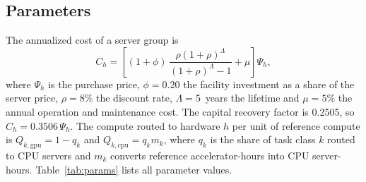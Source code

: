 \documentclass[11pt]{article}
\begin{document}
\subsection*{Parameters}
The annualized cost of a server group is
\begin{equation}
C_h=\left[(1+\phi)\,\frac{\rho(1+\rho)^{\Lambda}}{(1+\rho)^{\Lambda}-1}+\mu\right]\Psi_h,\label{eq:annual}
\end{equation}
where $\Psi_h$ is the purchase price, $\phi=0.20$ the facility investment as a share of the server price, $\rho=8\%$ the discount rate, $\Lambda=5$~years the lifetime and $\mu=5\%$ the annual operation and maintenance cost. The capital recovery factor is 0.2505, so $C_h=0.3506\,\Psi_h$. The compute routed to hardware $h$ per unit of reference compute is $Q_{k,\mathrm{gpu}}=1-q_k$ and $Q_{k,\mathrm{cpu}}=q_k m_k$, where $q_k$ is the share of task class $k$ routed to CPU servers and $m_k$ converts reference accelerator-hours into CPU server-hours. Table~\ref{tab:params} lists all parameter values.
\end{document}
